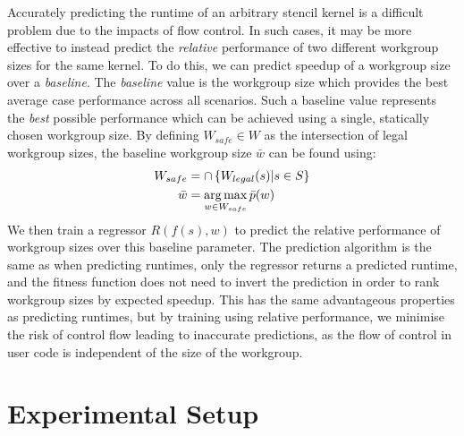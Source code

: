 \documentclass[nonatbib,preprint,10pt]{sigplanconf}
\begin{document}
Accurately predicting the runtime of an arbitrary stencil kernel is a
difficult problem due to the impacts of flow control. In such cases,
it may be more effective to instead predict the \emph{relative}
performance of two different workgroup sizes for the same kernel. To
do this, we can predict speedup of a workgroup size over a
\emph{baseline}. The \emph{baseline} value is the workgroup size which
provides the best average case performance across all scenarios. Such
a baseline value represents the \emph{best} possible performance which
can be achieved using a single, statically chosen workgroup size. By
defining $W_{safe} \in W$ as the intersection of legal workgroup
sizes, the baseline workgroup size $\bar{w}$ can be found using:
%
\begin{align}
W_{safe} &= \cap \left\{ W_{legal}(s) | s \in S \right\}\\
\bar{w} &= \operatorname*{arg\,max}_{w \in W_{safe}} \bar{p}(w)
\end{align}
%
We then train a regressor $R(f(s), w)$ to predict the relative
performance of workgroup sizes over this baseline parameter. The
prediction algorithm is the same as when predicting runtimes, only the
regressor returns a predicted runtime, and the fitness function does
not need to invert the prediction in order to rank workgroup sizes by
expected speedup. This has the same advantageous properties as
predicting runtimes, but by training using relative performance, we
minimise the risk of control flow leading to inaccurate predictions,
as the flow of control in user code is independent of the size of the
workgroup.


\section{Experimental Setup}
\end{document}
